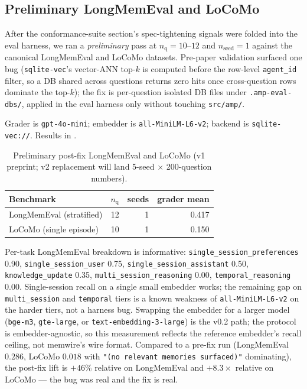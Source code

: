 \documentclass[11pt,letterpaper,twocolumn]{article}
\begin{document}
\subsection{Preliminary LongMemEval and LoCoMo}
\label{sec:eval-mem-benchmarks}

After the conformance-suite section's spec-tightening signals were folded into the eval harness, we ran a \emph{preliminary} pass at $n_{\text{q}} = 10$--$12$ and $n_{\text{seed}} = 1$ against the canonical LongMemEval \cite{wu2024longmemeval} and LoCoMo \cite{maharana2024locomo} datasets. Pre-paper validation surfaced one bug (\texttt{sqlite-vec}'s vector-ANN top-$k$ is computed before the row-level \texttt{agent\_id} filter, so a DB shared across questions returns zero hits once cross-question rows dominate the top-$k$); the fix is per-question isolated DB files under \texttt{.amp-eval-dbs/}, applied in the eval harness only without touching \texttt{src/amp/}.

Grader is \texttt{gpt-4o-mini}; embedder is \texttt{all-MiniLM-L6-v2}; backend is \texttt{sqlite-vec://}. Results in .

\begin{table}[t]
\centering
\caption{Preliminary post-fix LongMemEval and LoCoMo (v1 preprint; v2 replacement will land 5-seed $\times$ 200-question numbers).}
\label{tab:mem-benchmarks}
\begin{tabular}{lrrr}
\toprule
Benchmark & $n_{\text{q}}$ & seeds & grader mean \\
\midrule
LongMemEval (stratified) & 12 & 1 & 0.417 \\
LoCoMo (single episode)  & 10 & 1 & 0.150 \\
\bottomrule
\end{tabular}
\end{table}

Per-task LongMemEval breakdown is informative: \texttt{single\_session\_preferences} 0.90, \texttt{single\_session\_user} 0.75, \texttt{single\_session\_assistant} 0.50, \texttt{knowledge\_update} 0.35, \texttt{multi\_session\_reasoning} 0.00, \texttt{temporal\_reasoning} 0.00. Single-session recall on a single small embedder works; the remaining gap on \texttt{multi\_session} and \texttt{temporal} tiers is a known weakness of \texttt{all-MiniLM-L6-v2} on the harder tiers, not a harness bug. Swapping the embedder for a larger model (\texttt{bge-m3}, \texttt{gte-large}, or \texttt{text-embedding-3-large}) is the v0.2 path; the protocol is embedder-agnostic, so this measurement reflects the reference embedder's recall ceiling, not memwire's wire format. Compared to a pre-fix run (LongMemEval $0.286$, LoCoMo $0.018$ with \texttt{"(no relevant memories surfaced)"} dominating), the post-fix lift is $+46\%$ relative on LongMemEval and $+8.3\times$ relative on LoCoMo --- the bug was real and the fix is real.
\end{document}
